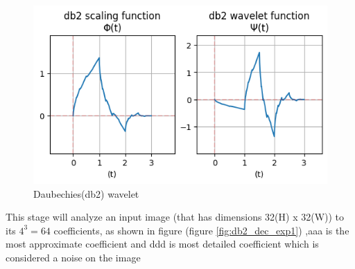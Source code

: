 \documentclass{svproc}
\begin{document}
\begin{figure}[H]
  \centering
    \includegraphics[width=0.5\linewidth]{figures/wavelet_db2.png}
    \caption{Daubechies(db2) wavelet}
    \label{fig:db2}
\end{figure}

\noindent
This stage will analyze an input image (that has dimensions 32(H) x 32(W)) to its $4^3 = 64$ coefficients, as shown in figure (figure \ref{fig:db2_dec_exp1}) ,aaa is the most approximate coefficient and ddd is most detailed coefficient which is considered a noise on the image 
\end{document}
